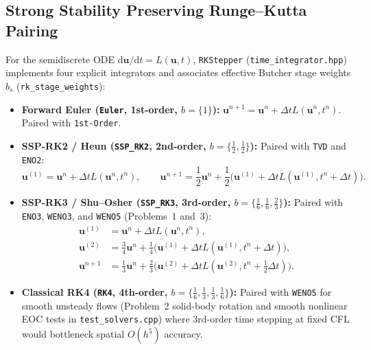 \documentclass[11pt,a4paper]{article}
\theoremstyle{definition}
\newcommand{\dd}{\mathrm{d}}
\newcommand{\code}[1]{\texttt{#1}}
\begin{document}
\subsection{Strong Stability Preserving Runge--Kutta Pairing}

For the semidiscrete ODE $\dd\mathbf{u}/\dd t = L(\mathbf{u},t)$, \code{RKStepper} (\code{time\_integrator.hpp}) implements four explicit integrators and associates effective Butcher stage weights $b_s$ (\code{rk\_stage\_weights}):
\begin{itemize}
\item \textbf{Forward Euler (\code{Euler}, 1st-order, $b=\{1\}$):} $\mathbf{u}^{n+1} = \mathbf{u}^n + \Delta t L(\mathbf{u}^n, t^n)$. Paired with \code{1st-Order}.
\item \textbf{SSP-RK2 / Heun (\code{SSP\_RK2}, 2nd-order, $b=\{\tfrac{1}{2},\tfrac{1}{2}\}$):} Paired with \code{TVD} and \code{ENO2}:
  \[
  \mathbf{u}^{(1)} = \mathbf{u}^n + \Delta t L(\mathbf{u}^n, t^n), \qquad
  \mathbf{u}^{n+1} = \frac{1}{2}\mathbf{u}^n + \frac{1}{2}\bigl(\mathbf{u}^{(1)} + \Delta t L(\mathbf{u}^{(1)}, t^n + \Delta t)\bigr).
  \]
\item \textbf{SSP-RK3 / Shu--Osher (\code{SSP\_RK3}, 3rd-order, $b=\{\tfrac{1}{6},\tfrac{1}{6},\tfrac{2}{3}\}$):} Paired with \code{ENO3}, \code{WENO3}, and \code{WENO5} (Problems~1 and~3):
  \begin{align*}
  \mathbf{u}^{(1)} &= \mathbf{u}^n + \Delta t L(\mathbf{u}^n, t^n),\\
  \mathbf{u}^{(2)} &= \frac{3}{4}\mathbf{u}^n + \frac{1}{4}\bigl(\mathbf{u}^{(1)} + \Delta t L(\mathbf{u}^{(1)}, t^n + \Delta t)\bigr),\\
  \mathbf{u}^{n+1} &= \frac{1}{3}\mathbf{u}^n + \frac{2}{3}\bigl(\mathbf{u}^{(2)} + \Delta t L(\mathbf{u}^{(2)}, t^n + \tfrac{1}{2}\Delta t)\bigr).
  \end{align*}
\item \textbf{Classical RK4 (\code{RK4}, 4th-order, $b=\{\tfrac{1}{6},\tfrac{1}{3},\tfrac{1}{3},\tfrac{1}{6}\}$):} Paired with \code{WENO5} for smooth unsteady flows (Problem~2 solid-body rotation and smooth nonlinear EOC tests in \code{test\_solvers.cpp}) where 3rd-order time stepping at fixed CFL would bottleneck spatial $O(h^5)$ accuracy.
\end{itemize}
\end{document}
